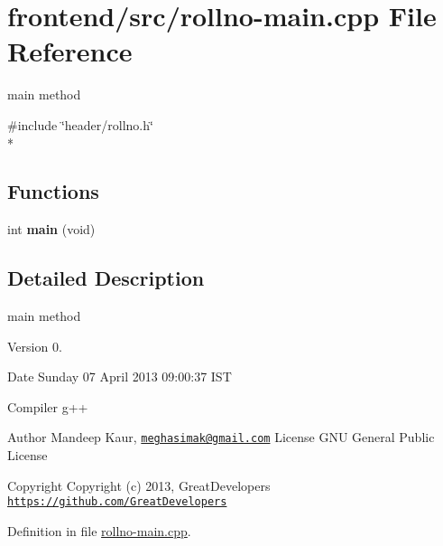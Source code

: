 \hypertarget{rollno-main_8cpp}{\section{frontend/src/rollno-\/main.cpp File Reference}
\label{rollno-main_8cpp}
}


main method  


{\ttfamily \#include \char`\"{}header/rollno.\-h\char`\"{}}\\*
\subsection*{Functions}
\begin{DoxyCompactItemize}
\item 
\hypertarget{rollno-main_8cpp_a840291bc02cba5474a4cb46a9b9566fe}{int {\bfseries main} (void)}\label{rollno-main_8cpp_a840291bc02cba5474a4cb46a9b9566fe}

\end{DoxyCompactItemize}


\subsection{Detailed Description}
main method \begin{DoxyVersion}{Version}
0. 
\end{DoxyVersion}
\begin{DoxyDate}{Date}
Sunday 07 April 2013 09\-:00\-:37 I\-S\-T\par
 Compiler g++
\end{DoxyDate}
\begin{DoxyAuthor}{Author}
Mandeep Kaur, \href{mailto:meghasimak@gmail.com}{\tt meghasimak@gmail.\-com} License G\-N\-U General Public License 
\end{DoxyAuthor}
\begin{DoxyCopyright}{Copyright}
Copyright (c) 2013, Great\-Developers \href{https://github.com/GreatDevelopers}{\tt https\-://github.\-com/\-Great\-Developers} 
\end{DoxyCopyright}


Definition in file \hyperlink{rollno-main_8cpp_source}{rollno-\/main.\-cpp}.

